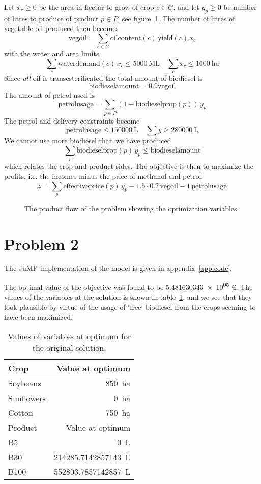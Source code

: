 \documentclass{article}
\begin{document}
Let $x_c \ge 0$ be the area in hectar to grow of crop $c \in C$,
and let $y_p \ge 0$ be number of litres to produce of product $p \in P$,
see figure~\ref{fig:productflow}.
The number of litres of vegetable oil produced then becomes
$$ \text{vegoil} = \sum_{c \in C} \text{oilcontent}(c) \, \text{yield}(c) \, x_c $$
with the water and area limits
$$ \sum_c \text{waterdemand}(c) \, x_c \le \SI{5000}{\mega\liter} \quad
\sum_c x_c \le \SI{1600}{\hectare} $$
Since \emph{all} oil is transesterificated the total amount of biodiesel is
$$ \text{biodieselamount} = 0.9 \text{vegoil} $$
The amount of petrol used is
$$ \text{petrolusage} = \sum_{p \in P} (1 - \text{biodieselprop}(p)) \, y_p $$
The petrol and delivery constraints become
$$ \text{petrolusage} \le \SI{150000}{\liter} \quad \sum y \ge \SI{280000}{\liter} $$
We cannot use more biodiesel than we have produced
$$ \sum_p \text{biodieselprop}(p) \, y_p \le \text{biodieselamount} $$
which relates the crop and product sides.
The objective  is then to maximize the profits,
i.e. the incomes minus the price of methanol and petrol,
$$ z = \sum_p \text{effectiveprice}(p) \, y_p - \num{1.5} \cdot 0.2 \, \text{vegoil} - 1 \, \text{petrolusage} $$

\begin{figure}
	\centering
	\def\svgwidth{\textwidth}
	
	\caption{The product flow of the problem
	showing the optimization variables. \label{fig:productflow}}
\end{figure}

\section{Problem 2}
The JuMP implementation of the model is given in appendix~\ref{app:code}.

The optimal value of the objective was found to be
\num{5.481630343e+05} \euro.
The values of the variables at the solution is shown in table~\ref{tab:optimal_values},
and we see that they look plausible by virtue of the usage of `free' biodiesel
from the crops seeming to have been maximized.

\begin{table}
	\centering
	\caption{Values of variables at optimum for the original solution. \label{tab:optimal_values}}
	\begin{tabular}{l r}
		\toprule
		Crop       & Value at optimum               \\
		\midrule
		Soybeans   & \SI{850}{\hectare}             \\
		Sunflowers & \SI{0}{\hectare}               \\
		Cotton     & \SI{750}{\hectare}             \\
		\bottomrule
		\toprule
		Product    & Value at optimum               \\
		\midrule
		B5         & \SI{0}{\liter}                 \\
		B30        & \SI{214285.7142857143}{\liter} \\
		B100       & \SI{552803.7857142857}{\liter} \\
		\bottomrule
	\end{tabular}
\end{table}
\end{document}
